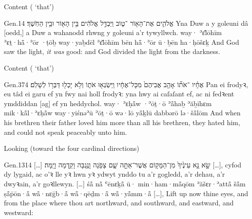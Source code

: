 \begin{frame}{\ex Content ( ‘that’)}
	\begin{example}{Gen.}{1}{4}{}{}
		\quoling
		{ אֱלֹהִ֛ים אֶת־הָא֖וֹר ־ט֑וֹב וַיַּבְדֵּ֣ל אֱלֹהִ֔ים בֵּ֥ין הָא֖וֹר וּבֵ֥ין הַחֹֽשֶׁךְ׃}
		{Yna Duw a  y goleuni  dâ [oedd,] a Duw a wahanodd rhwng y goleuni a’r tywyllwch.}
		{way· ʾɛ̆lōhīm ʾɛṯ·hå̄·ʾōr ·ṭōḇ way·yaḇdēl ʾɛ̆lōhīm bēn hå̄·ʾōr ū·ḇēn ha·ḥōšɛḵ}
		{And God saw the light,  \emph{it was} good: and God divided the light from the darkness.}
	\end{example}
\end{frame}


\begin{frame}{\ex Content ( ‘that’)}
	\begin{example}{Gen.}{37}{4}{}{}
		\quoling
		{ אֶחָ֗יו ־אֹת֞וֹ אָהַ֤ב אֲבִיהֶם֙ מִכָּל־אֶחָ֔יו וַֽיִּשְׂנְא֖וּ אֹת֑וֹ וְלֹ֥א יָכְל֖וּ דַּבְּר֥וֹ לְשָׁלֹֽם׃}
		{Pan  ei frodyꝛ,  eu tâd  ei garu ef yn fwy nai holl frodyꝛ: yna hwy ai caſaſant ef, ac ni fedꝛent ymddiddan [ag] ef yn heddychol.}
		{way· ʾɛḥå̄w ·ʾōṯ·ō ʾå̄haḇ ʾăḇīhɛm mik·kå̄l·ʾɛḥå̄w way·yiśnəʾū ʾōṯ·ō wə·lō yå̄ḵlū dabbərō lə·šå̄lōm}
		{And when his brethren   their father loved him more than all his brethren, they hated him, and could not speak peaceably unto him.}
	\end{example}
\end{frame}




\begin{frame}{\ex Looking (toward the four cardinal directions)}
	\begin{example}{Gen.}{13}{14}{}{}
		\quoling
		{[…] שָׂ֣א נָ֤א עֵינֶ֙יךָ֙  מִן־הַמָּק֖וֹם אֲשֶׁר־אַתָּ֣ה שָׁ֑ם צָפֹ֥נָה וָנֶ֖גְבָּה וָקֵ֥דְמָה וָיָֽמָּה׃}
		{[…], cyfod dy lygaid, ac  o’ꝛ lle yꝛ hwn yꝛ ydwyt ynddo tu a’r gogledd, a’r dehau, a’r dwyꝛain, a’r goꝛllewyn.}
		{[…] śå̄ nå̄ ʿēnɛḵå̄ ū· min·ham·må̄qōm ʾăšɛr·ʾattå̄ šå̄m ṣå̄p̄ōn·å̄ wå̄·nɛḡb·å̄ wå̄·qēḏm·å̄ wå̄·yå̄mm·å̄}
		{[…], Lift up now thine eyes, and  from the place where thou art northward, and southward, and eastward, and westward:}
	\end{example}
\end{frame}


